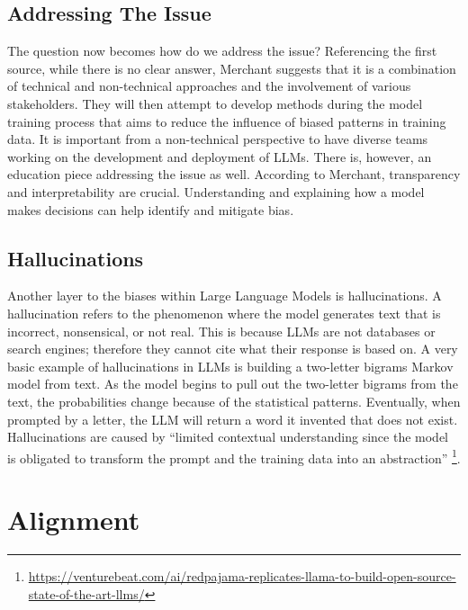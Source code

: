 \documentclass[
]{book}
\begin{document}
\hypertarget{addressing-the-issue}{%
\section{Addressing The Issue}\label{addressing-the-issue}}

The question now becomes how do we address the issue? Referencing the first source, while there is no clear answer, Merchant suggests that it is a combination of technical and non-technical approaches and the involvement of various stakeholders. They will then attempt to develop methods during the model training process that aims to reduce the influence of biased patterns in training data. It is important from a non-technical perspective to have diverse teams working on the development and deployment of LLMs. There is, however, an education piece addressing the issue as well. According to Merchant, transparency and interpretability are crucial. Understanding and explaining how a model makes decisions can help identify and mitigate bias.

\hypertarget{hallucinations}{%
\section{Hallucinations}\label{hallucinations}}

Another layer to the biases within Large Language Models is hallucinations. A hallucination refers to the phenomenon where the model generates text that is incorrect, nonsensical, or not real. This is because LLMs are not databases or search engines; therefore they cannot cite what their response is based on. A very basic example of hallucinations in LLMs is building a two-letter bigrams Markov model from text. As the model begins to pull out the two-letter bigrams from the text, the probabilities change because of the statistical patterns. Eventually, when prompted by a letter, the LLM will return a word it invented that does not exist. Hallucinations are caused by ``limited contextual understanding since the model is obligated to transform the prompt and the training data into an abstraction'' \footnote{\url{https://venturebeat.com/ai/redpajama-replicates-llama-to-build-open-source-state-of-the-art-llms/}}.

\hypertarget{alignment}{%
\chapter{Alignment}\label{alignment}}
\end{document}
